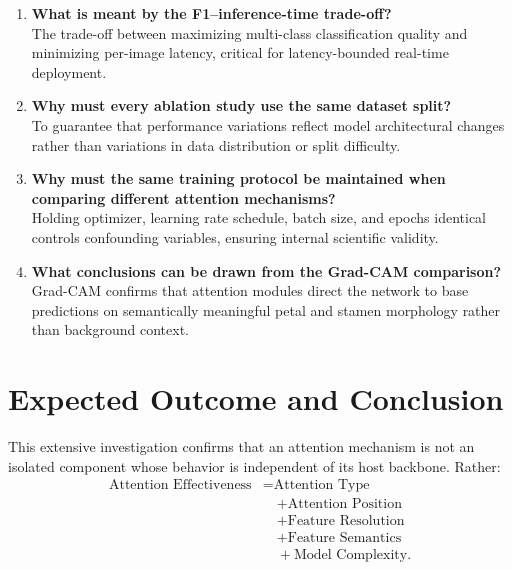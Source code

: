 \documentclass[11pt,a4paper]{article}
\begin{document}
\begin{enumerate}[label=\textbf{\arabic*.}]
    \item \textbf{What is meant by the F1--inference-time trade-off?} \\
    The trade-off between maximizing multi-class classification quality and minimizing per-image latency, critical for latency-bounded real-time deployment.

    \item \textbf{Why must every ablation study use the same dataset split?} \\
    To guarantee that performance variations reflect model architectural changes rather than variations in data distribution or split difficulty.

    \item \textbf{Why must the same training protocol be maintained when comparing different attention mechanisms?} \\
    Holding optimizer, learning rate schedule, batch size, and epochs identical controls confounding variables, ensuring internal scientific validity.

    \item \textbf{What conclusions can be drawn from the Grad-CAM comparison?} \\
    Grad-CAM confirms that attention modules direct the network to base predictions on semantically meaningful petal and stamen morphology rather than background context.
\end{enumerate}

\section{Expected Outcome and Conclusion}
This extensive investigation confirms that an attention mechanism is not an isolated component whose behavior is independent of its host backbone. Rather:
\begin{align}
\text{Attention Effectiveness} &= \text{Attention Type} \nonumber \\
&\quad + \text{Attention Position} \nonumber \\
&\quad + \text{Feature Resolution} \nonumber \\
&\quad + \text{Feature Semantics} \nonumber \\
&\quad + \text{Model Complexity}.
\end{align}
\end{document}
